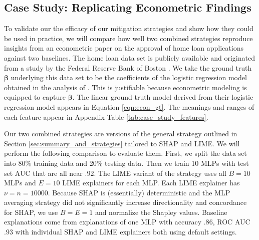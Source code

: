 \documentclass[mnsc,blindrev]{informs3}
\begin{document}
\subsection{Case Study: Replicating Econometric Findings}
    \label{sec:case_study}
    To validate our the efficacy of our mitigation strategies and show how they could be used in practice, we will compare how well two combined strategies reproduce insights from an econometric paper on the approval of home loan applications \citep{bane2006econometric} against two baselines. The home loan data set is publicly available and originated from a study by the Federal Reserve Bank of Boston \citep{hunter1996cultural}. We take the ground truth $\boldsymbol{\beta}$ underlying this data set to be the coefficients of the logistic regression model obtained in the analysis of \cite{bane2006econometric}. This is justifiable because econometric modeling is equipped to capture $\boldsymbol{\beta}$. The linear ground truth model derived from their logistic regression model appears in Equation \ref{eqn:econ_gt}. The meanings and ranges of each feature appear in Appendix Table \ref{tab:case_study_features}.  %

    Our two combined strategies are versions of the general strategy outlined in Section \ref{sec:summary_and_strategies} tailored to SHAP and LIME. We will perform the following comparison to evaluate them. First, we split the data set into 80\% training data and 20\% testing data. Then we train 10 MLPs with test set AUC that are all near $.92$. The LIME variant of the strategy uses all $B=10$ MLPs and $E=10$ LIME explainers for each MLP. Each LIME explainer has $\nu=n=10000$. Because SHAP is (essentially) deterministic and the MLP averaging strategy did not significantly increase directionality and concordance for SHAP, we use $B=E=1$ and normalize the Shapley values. Baseline explanations come from explanations of one MLP with accuracy $.86$, ROC AUC $.93$ with individual SHAP and LIME explainers both using default settings. 
    
\end{document}

